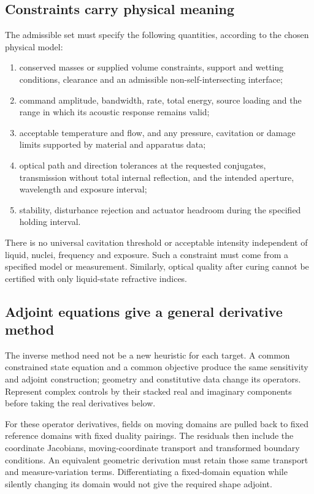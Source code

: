 \subsection{Constraints carry physical meaning}
The admissible set must specify the following quantities, according to the
chosen physical model:
\begin{enumerate}
\item conserved masses or supplied volume constraints, support and wetting
conditions, clearance and an admissible non-self-intersecting interface;
\item command amplitude, bandwidth, rate, total energy, source loading and
the range in which its acoustic response remains valid;
\item acceptable temperature and flow, and any pressure, cavitation or damage
limits supported by material and apparatus data;
\item optical path and direction tolerances at the requested conjugates,
transmission without total internal reflection, and the intended aperture,
wavelength and exposure interval;
\item stability, disturbance rejection and actuator headroom during the
specified holding interval.
\end{enumerate}
There is no universal cavitation threshold or acceptable intensity independent
of liquid, nuclei, frequency and exposure. Such a constraint must come from a
specified model or measurement. Similarly, optical quality after curing cannot
be certified with only liquid-state refractive indices.

\subsection{Adjoint equations give a general derivative method}
The inverse method need not be a new heuristic for each target. A common
constrained state equation and a common objective produce the same sensitivity
and adjoint construction; geometry and constitutive data change its operators.
Represent complex controls by their stacked real and imaginary components
before taking the real derivatives below.

For these operator derivatives, fields on moving domains are pulled back to
fixed reference domains with fixed duality pairings. The residuals then include
the coordinate Jacobians, moving-coordinate transport and transformed boundary
conditions. An equivalent geometric derivation must retain those same transport
and measure-variation terms. Differentiating a fixed-domain equation while
silently changing its domain would not give the required shape adjoint.

